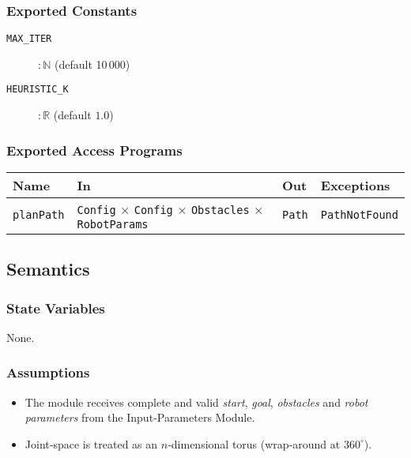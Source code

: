 \documentclass[12pt, titlepage]{article}
\begin{document}
\subsubsection{Exported Constants}
\begin{description}
  \item[\texttt{MAX\_ITER}] $\!:\! \mathbb{N}$ \hfill (default 10\,000)
  \item[\texttt{HEURISTIC\_K}] $\!:\! \mathbb{R}$ \hfill (default $1.0$)
\end{description}

\subsubsection{Exported Access Programs}
\begin{center}
\renewcommand{\arraystretch}{1.35}
\begin{tabular}{p{3.1cm} p{5.3cm} p{3.8cm} p{3.2cm}}
\toprule
\textbf{Name} & \textbf{In} & \textbf{Out} & \textbf{Exceptions}\\ \midrule
\texttt{planPath} & \texttt{Config} $\times$ \texttt{Config} $\times$ \texttt{Obstacles} $\times$ \texttt{RobotParams} & \texttt{Path} & \texttt{PathNotFound} \\
\bottomrule
\end{tabular}
\end{center}

\subsection{Semantics}
\subsubsection{State Variables}
None.

\subsubsection{Assumptions}
\begin{itemize}
  \item The module receives complete and valid \textit{start}, \textit{goal}, \textit{obstacles}
        and \textit{robot parameters} from the Input‑Parameters Module.
  \item Joint‑space is treated as an $n$‑dimensional torus
        (wrap‑around at $360^{\circ}$).
\end{itemize}
\end{document}
